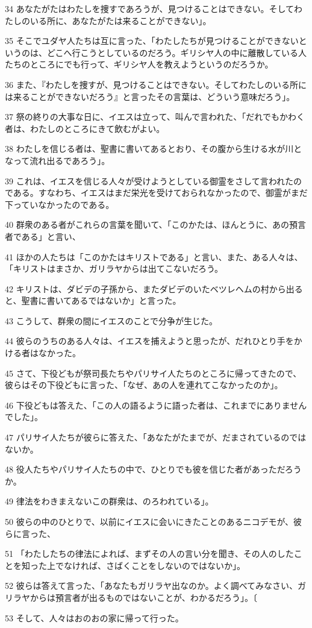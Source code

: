 \par 34 あなたがたはわたしを捜すであろうが、見つけることはできない。そしてわたしのいる所に、あなたがたは来ることができない」。
\par 35 そこでユダヤ人たちは互に言った、「わたしたちが見つけることができないというのは、どこへ行こうとしているのだろう。ギリシヤ人の中に離散している人たちのところにでも行って、ギリシヤ人を教えようというのだろうか。
\par 36 また、『わたしを捜すが、見つけることはできない。そしてわたしのいる所には来ることができないだろう』と言ったその言葉は、どういう意味だろう」。
\par 37 祭の終りの大事な日に、イエスは立って、叫んで言われた、「だれでもかわく者は、わたしのところにきて飲むがよい。
\par 38 わたしを信じる者は、聖書に書いてあるとおり、その腹から生ける水が川となって流れ出るであろう」。
\par 39 これは、イエスを信じる人々が受けようとしている御霊をさして言われたのである。すなわち、イエスはまだ栄光を受けておられなかったので、御霊がまだ下っていなかったのである。
\par 40 群衆のある者がこれらの言葉を聞いて、「このかたは、ほんとうに、あの預言者である」と言い、
\par 41 ほかの人たちは「このかたはキリストである」と言い、また、ある人々は、「キリストはまさか、ガリラヤからは出てこないだろう。
\par 42 キリストは、ダビデの子孫から、またダビデのいたベツレヘムの村から出ると、聖書に書いてあるではないか」と言った。
\par 43 こうして、群衆の間にイエスのことで分争が生じた。
\par 44 彼らのうちのある人々は、イエスを捕えようと思ったが、だれひとり手をかける者はなかった。
\par 45 さて、下役どもが祭司長たちやパリサイ人たちのところに帰ってきたので、彼らはその下役どもに言った、「なぜ、あの人を連れてこなかったのか」。
\par 46 下役どもは答えた、「この人の語るように語った者は、これまでにありませんでした」。
\par 47 パリサイ人たちが彼らに答えた、「あなたがたまでが、だまされているのではないか。
\par 48 役人たちやパリサイ人たちの中で、ひとりでも彼を信じた者があっただろうか。
\par 49 律法をわきまえないこの群衆は、のろわれている」。
\par 50 彼らの中のひとりで、以前にイエスに会いにきたことのあるニコデモが、彼らに言った、
\par 51 「わたしたちの律法によれば、まずその人の言い分を聞き、その人のしたことを知った上でなければ、さばくことをしないのではないか」。
\par 52 彼らは答えて言った、「あなたもガリラヤ出なのか。よく調べてみなさい、ガリラヤからは預言者が出るものではないことが、わかるだろう」。〔
\par 53 そして、人々はおのおの家に帰って行った。

